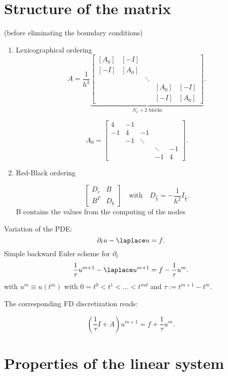 \section{Structure of the matrix}%
\label{sec:Structure of the matrix}
(before eliminating the boundary conditions)
\begin{enumerate}[label=\alph{enumi})]
	\item Lexicographical ordering
		\[
		A= \frac{1}{h^{2}}
		\underbrace{
		\begin{bmatrix}
			[A_{0}] & [-I] &&& \\
			[-I] & [A_0] &&&\\
				 &&\ddots && \\
				 &&& [A_0] & [-I] \\
				 &&& [-I]& [A_0]
		\end{bmatrix}
		}_{N_{x}+2 \text{ blocks}}
		.\] 

		\[
		A_0 = \begin{bmatrix}
			4 & -1 &&& \\
			-1 & 4 & -1 && \\
			 & -1 & \ddots && \\
			 &&&\ddots & -1 \\
			 &&&-1 & 4
		\end{bmatrix}
		.\] 
	\item Red-Black ordering

		\[
			\begin{bmatrix}
				D_{r} & B \\
				B^{T} & D_{b}
			\end{bmatrix}
			\quad \text{with}\quad D_{\frac{r}{b}}=-\frac{1}{h^{2}}I_{\frac{r}{b}}
		.\] 
		B contains the values from the computing of the nodes
\end{enumerate}

Variation of the PDE:
\[
\partial_{t}u- \laplace u=f
.\] 
Simple backward Euler scheme for $\partial_{t}$
\[
\frac{1}{\tau}u^{m+1}- \laplace u^{m+1} = f -\frac{1}{\tau}u^{m}
.\] 
with $u^{m} \equiv u(t^{m})$ with $0=t^{0}<t^{1}< \ldots  < t^{md}$ and $\tau:=t^{m+1}-t^{m}$.

The corresponding FD discretization reads:

\[
	\left(\frac{1}{\tau}I + A\right) u^{m+1} = f + \frac{1}{\tau}u^{m}
.\] 

\section{Properties of the linear system}%
\label{sec:Properties of the linear system}

